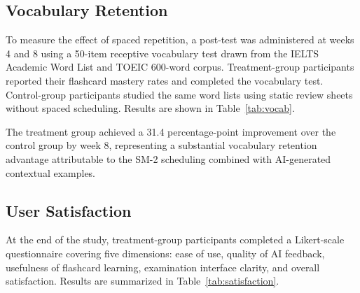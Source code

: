 \documentclass[conference]{IEEEtran}
\begin{document}
\subsection{Vocabulary Retention}
To measure the effect of spaced repetition, a post-test was administered at weeks 4 and 8 using a 50-item receptive vocabulary test drawn from the IELTS Academic Word List and TOEIC 600-word corpus. Treatment-group participants reported their flashcard mastery rates and completed the vocabulary test. Control-group participants studied the same word lists using static review sheets without spaced scheduling. Results are shown in Table~\ref{tab:vocab}.

\begin{table}[htbp]
\caption{Vocabulary Test Accuracy by Group and Week}
\label{tab:vocab}
\centering
{}
\end{table}

The treatment group achieved a 31.4 percentage-point improvement over the control group by week 8, representing a substantial vocabulary retention advantage attributable to the SM-2 scheduling combined with AI-generated contextual examples.

\subsection{User Satisfaction}
At the end of the study, treatment-group participants completed a Likert-scale questionnaire covering five dimensions: ease of use, quality of AI feedback, usefulness of flashcard learning, examination interface clarity, and overall satisfaction. Results are summarized in Table~\ref{tab:satisfaction}.

\begin{table}[htbp]
\caption{User Satisfaction Survey Results ($n=60$, scale 1--5)}
\label{tab:satisfaction}
\centering
{}
\end{table}
\end{document}
